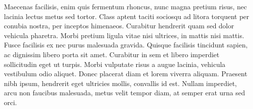 \begin{abstracts}
Maecenas facilisis, enim quis fermentum rhoncus, nunc magna pretium risus, nec lacinia lectus metus sed tortor. Class aptent taciti sociosqu ad litora torquent per conubia nostra, per inceptos himenaeos. Curabitur hendrerit quam sed dolor vehicula pharetra. Morbi pretium ligula vitae nisi ultrices, in mattis nisi mattis. Fusce facilisis ex nec purus malesuada gravida. Quisque facilisis tincidunt sapien, ac dignissim libero porta sit amet. Curabitur in sem et libero imperdiet sollicitudin eget ut turpis. Morbi vulputate risus a augue lacinia, vehicula vestibulum odio aliquet. Donec placerat diam et lorem viverra aliquam. Praesent nibh ipsum, hendrerit eget ultricies mollis, convallis id est. Nullam imperdiet, arcu non faucibus malesuada, metus velit tempor diam, at semper erat urna sed orci.

\end{abstracts}
